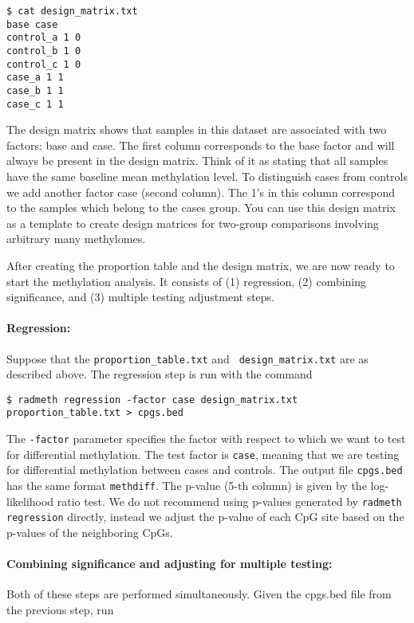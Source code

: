 \documentclass[10pt]{article}
\begin{document}
{\small{%
\begin{verbatim}
$ cat design_matrix.txt
base case
control_a 1 0
control_b 1 0
control_c 1 0
case_a 1 1
case_b 1 1
case_c 1 1
\end{verbatim}%
}}

The design matrix shows that samples in this dataset are associated with two 
factors: base and case. The first column corresponds to the base factor and 
will always be present in the design matrix. Think of it as stating that all 
samples have the same baseline mean methylation level. To distinguish 
cases from controls we add another factor case (second column). The 1's in 
this column correspond to the samples which belong to the cases group. You 
can use this design matrix as a template to create design matrices for 
two-group comparisons involving arbitrary many methylomes.

After creating the proportion table and the design matrix, we are now ready to
start the methylation analysis. It consists of (1) regression, (2) combining
significance, and (3) multiple testing adjustment steps.

\paragraph{Regression:} Suppose that the {\tt proportion\_table.txt} and {\tt 
design\_matrix.txt} are as described above. The regression step is run with 
the command

{\small{%
\begin{verbatim}
$ radmeth regression -factor case design_matrix.txt proportion_table.txt > cpgs.bed
\end{verbatim}%
}}

The {\tt -factor} parameter specifies the factor with respect to which we want to
test for differential methylation. The test factor is {\tt case}, meaning that we
are testing for differential methylation between cases and controls. The output  
file {\tt cpgs.bed} has the same format {\tt methdiff}. The p-value (5-th column) 
is given by the log-likelihood ratio test. We do not recommend using p-values 
generated by {\tt radmeth regression} directly, instead we adjust the p-value of 
each CpG site based on the p-values of the neighboring CpGs.

\paragraph{Combining significance and adjusting for multiple testing:} Both of 
these steps are performed simultaneously. Given the cpgs.bed file from the previous 
step, run
\end{document}
